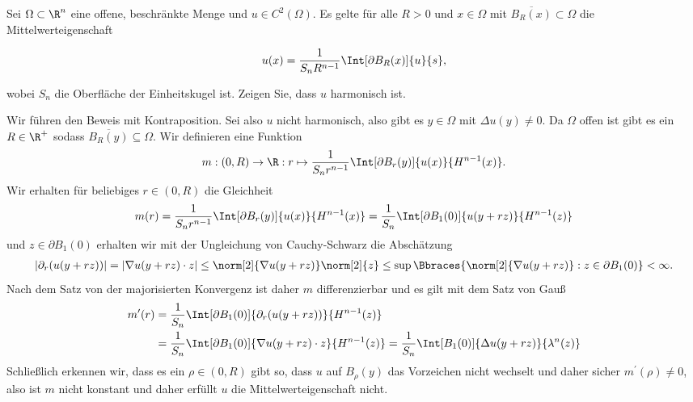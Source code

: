 
\begin{exercise}

Sei $\Omega \subset \R^n$ eine offene, beschränkte Menge und $u \in C^2(\Omega)$.
Es gelte für alle $R > 0$ und $x \in \Omega$ mit $\overline{B_R(x)} \subset \Omega$ die Mittelwerteigenschaft

\begin{align*}
    u(x)
    =
    \frac{1}{S_n R^{n-1}}
    \Int[\partial B_R(x)]{u}{s},
\end{align*}

wobei $S_n$ die Oberfläche der Einheitskugel ist.
Zeigen Sie, dass $u$ harmonisch ist.

\end{exercise}


\begin{solution}

Wir führen den Beweis mit Kontraposition. Sei also $u$ nicht harmonisch, also gibt es $y \in \Omega$ mit $\Delta u(y) \neq 0$. Da $\Omega$ offen ist gibt es ein $R \in \R^+$ sodass $\overline{B_R(y)} \subseteq \Omega$. Wir definieren eine Funktion
\begin{align*}
m: (0, R) \to \R : r \mapsto \frac{1}{S_n r^{n - 1}} \Int[\partial B_r(y)]{u(x)}{H^{n - 1}(x)}.
\end{align*}
Wir erhalten für beliebiges $r \in (0, R)$ die Gleichheit
\begin{align*}
m(r) = \frac{1}{S_n r^{n - 1}} \Int[\partial B_r(y)]{u(x)}{H^{n - 1}(x)} = \frac{1}{S_n}  \Int[\partial B_1(0)]{u(y + rz)}{H^{n - 1}(z)}
\end{align*}
und $z \in \partial B_1(0)$ erhalten wir mit der Ungleichung von Cauchy-Schwarz die Abschätzung
\begin{align*}
|\partial_r(u(y + rz))| = |\nabla u(y + rz) \cdot z| \leq \norm[2]{\nabla u(y + rz)} \norm[2]{z} \leq \sup\Bbraces{\norm[2]{\nabla u(y + rz)} : z \in \partial B_1(0)} < \infty.
\end{align*}
Nach dem Satz von der majorisierten Konvergenz ist daher $m$ differenzierbar und es gilt mit dem Satz von Gauß
\begin{align*}
m^\prime(r) &= \frac{1}{S_n}  \Int[\partial B_1(0)]{\partial_r(u(y + rz))}{H^{n - 1}(z)} \\
            &= \frac{1}{S_n}  \Int[\partial B_1(0)]{\nabla u(y + rz) \cdot z}{H^{n - 1}(z)} = \frac{1}{S_n}  \Int[B_1(0)]{\Delta u(y + rz)}{\lambda^n(z)}
\end{align*}
Schließlich erkennen wir, dass es ein $\rho \in (0, R)$ gibt so, dass $u$ auf $B_\rho(y)$ das Vorzeichen nicht wechselt und daher sicher $m^\prime(\rho) \neq 0$, also ist $m$ nicht konstant und daher erfüllt $u$ die Mittelwerteigenschaft nicht.
\end{solution}

